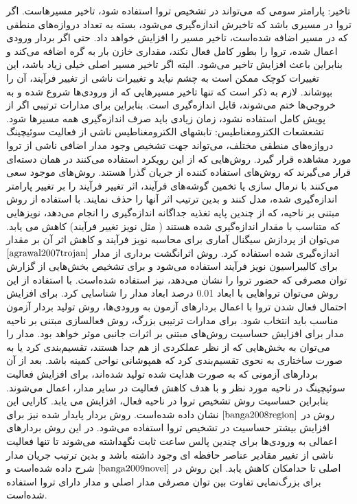 تاخیر: پارامتر سومی که می‌تواند در تشخیص تروا استفاده شود، تاخیر مسیرهاست. اگر تروا در مسیری باشد که تاخیرش اندازه‌گیری می‌شود، بسته به تعداد دروازه‌های منطقی که در مسیر اضافه شده‌است، تاخیر مسیر را افزایش خواهد داد. حتی اگر بردار ورودی اعمال شده، تروا را بطور کامل فعال نکند، مقداری خازن بار به گره اضافه می‌کند و بنابراین باعث افزایش تاخیر می‌شود. البته اگر تاخیر مسیر اصلی خیلی زیاد باشد، این تغییرات کوچک ممکن است به چشم نیاید و تغییرات ناشی از تغییر فرآیند، آن را بپوشاند. لازم به ذکر است که تنها تاخیر مسیرهایی که از ورودی‌ها شروع شده و به خروجی‌ها ختم می‌شوند، قابل اندازه‌گیری است. بنابراین برای مدارات ترتیبی اگر از پویش کامل استفاده نشود، زمان زیادی باید صرف اندازه‌گیری همه مسیرها شود.
تشعشعات الکترومغناطیس: تابشهای الکترومغناطیس ناشی از فعالیت سوئیچینگ دروازه‌های منطقی مختلف، می‌تواند جهت تشخیص وجود مدار اضافی ناشی از تروا مورد مشاهده قرار گیرد. روش‌هایی که از این رویکرد استفاده می‌کنند در همان دسته‌ای قرار می‌گیرند که روش‌های استفاده کننده از جریان گذرا هستند.
روش‌های موجود سعی می‌کنند با نرمال سازی یا تخمین گوشه‌های فرآیند، اثر تغییر فرآیند را بر تغییر پارامتر اندازه‌گیری شده، مدل کنند و بدین ترتیب اثر آنها را حذف نمایند. با استفاده از روش مبتنی بر ناحیه، که از چندین پایه تغذیه جداگانه اندازه‌گیری را انجام می‌دهد، نویزهایی که متناسب با مقدار اندازه‌گیری شده هستند ( مثل نویز تغییر فرآیند) کاهش می یابد. می‌توان از پردازش سیگنال آماری برای محاسبه نویز فرآیند و کاهش اثر آن بر مقدار اندازه‌گیری شده ‌استفاده کرد.
روش اثرانگشت برداری از مدار $\cite{agrawal2007trojan}$ برای کالیبراسیون نویز فرآیند استفاده می‌شود و برای تشخیص بخش‌هایی از گزارش توان مصرفی که حضور تروا را نشان می‌دهد، نیز استفاده شده‌است. با استفاده از این روش می‌توان تروا‌هایی با ابعاد 0.01 درصد ابعاد مدار را شناسایی کرد. 
برای افزایش احتمال فعال شدن تروا با اعمال بردارهای آزمون به ورودی‌ها، روش تولید بردار آزمون مناسب باید انتخاب شود. برای مدارات ترتیبی بزرگ، روش فعالسازی مبتنی بر ناحیه مدار برای افزایش حساسیت روش‌های مبتنی بر اثرات جانبی موثر خواهد بود. مدار را می‌توان به بخش‌هایی که از نظر عملکردی از هم جدا هستند، تقسیم‌بندی کرد یا به صورت ساختاری به نحوی تقسیم‌بندی کرد که همپوشانی نواحی کمینه باشد. بعد از آن بردارهای آزمونی که به صورت هدایت شده تولید شده‌اند، برای افزایش فعالیت سوئیچینگ در ناحیه مورد نظر و با هدف کاهش فعالیت در سایر مدار، اعمال می‌شوند. بنابراین حساسیت روش تشخیص تروا در ناحیه فعال، افزایش می یابد. کارایی این روش در $\cite{banga2008region}$ نشان داده شده‌است. روش بردار پایدار شده نیز برای افزایش بیشتر حساسیت در تشخیص تروا استفاده می‌شود. در این روش بردارهای اعمالی به ورودی‌ها برای چندین پالس ساعت ثابت نگهداشته می‌شوند تا تنها فعالیت ناشی از تغییر مقادیر عناصر حافظه ای وجود داشته باشد و بدین ترتیب جریان مدار اصلی تا حدامکان کاهش یابد. این روش در $\cite{banga2009novel}$ شرح داده شده‌است و برای بزرگ‌نمایی تفاوت بین توان مصرفی مدار اصلی و مدار دارای تروا استفاده شده‌است.
